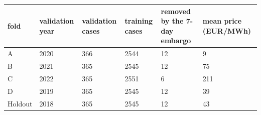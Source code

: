 \begin{tabular}{llllll}
\toprule
\textbf{fold} & \textbf{validation year} & \textbf{validation cases} & \textbf{training cases} & \textbf{removed by the 7-day embargo} & \textbf{mean price (EUR/MWh)} \\
\midrule
A & 2020 & 366 & 2544 & 12 & 9 \\
B & 2021 & 365 & 2545 & 12 & 75 \\
C & 2022 & 365 & 2551 & 6 & 211 \\
D & 2019 & 365 & 2545 & 12 & 39 \\
Holdout & 2018 & 365 & 2545 & 12 & 43 \\
\bottomrule
\end{tabular}
